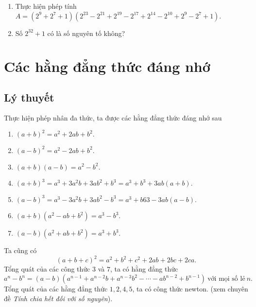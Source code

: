 \begin{bt}%
	\begin{enumerate}
	\item Thực hiện phép tính $A=(2^9+2^7+1)(2^{23}-2^{21}+2^{19}-2^{17}+2^{14}-2^{10}+2^9-2^7+1)$.
	\item Số $2^{32}+1$ có là số nguyên tố không?
	\end{enumerate}
\end{bt}

\section{Các hằng đẳng thức đáng nhớ}

\subsection{Lý thuyết}
Thực hiện phép nhân đa thức, ta được các hằng đẳng thức đáng nhớ sau

\begin{enumerate}[1.]
	\item $(a+b)^2=a^2+2ab+b^2$.
	\item $(a-b)^2=a^2-2ab+b^2$.
	\item $(a+b)(a-b)=a^2-b^2$.
	\item $(a+b)^3=a^3+3a^2b+3ab^2+b^3=a^3+b^3+3ab(a+b)$.
	\item $(a-b)^3=a^3-3a^2b+3ab^2-b^3=a^3+b63-3ab(a-b)$.
	\item $(a+b)(a^2-ab+b^2)=a^3-b^3$.
	\item $(a-b)(a^2+ab+b^2)=a^3+b^3$.
\end{enumerate}
Ta cũng có $$(a+b+c)^2=a^2+b^2+c^2+2ab+2bc+2ca.$$
Tổng quát của các công thức $3$ và $7$, ta có hằng đẳng thức
$$a^n-b^n=(a-b)(a^{n-1}+a^{n-2}b+a^{n-3}b^2-\cdots-ab^{n-2}+b^{n-1})\ \text{với mọi số lẻ}\ n.$$
Tổng quát của các hằng đẳng thức $1, 2, 4, 5$, ta có công thức newton. (xem chuyên đề \textit{Tính chia hết đối với số nguyên}).

